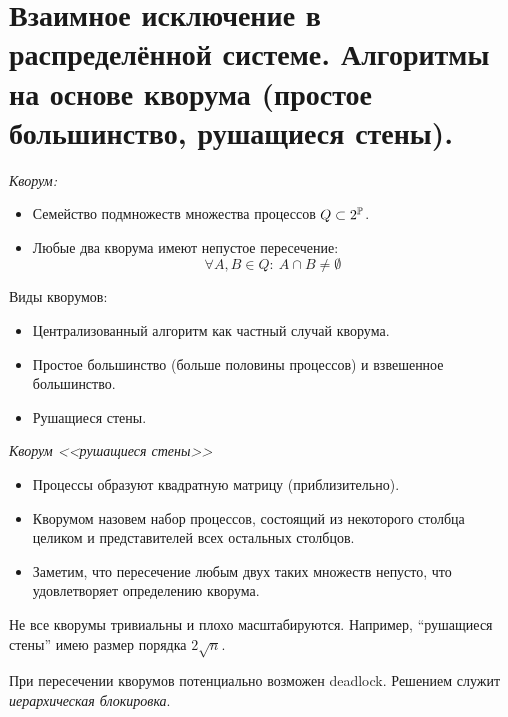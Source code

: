 \section{Взаимное исключение в распределённой системе.
Алгоритмы на основе кворума (простое большинство, рушащиеся стены).}

\begin{definition} \textit{Кворум:}
    \begin{itemize}
        \item Семейство подмножеств множества процессов $Q \subset 2^{\mathbb{P}}$.
        \item Любые два кворума имеют непустое пересечение:
            \[
                \forall A, B \in Q\colon~ A \cap B \neq \emptyset
            \]
    \end{itemize}
\end{definition}

\begin{examples} Виды кворумов:
    \begin{itemize}
        \item Централизованный алгоритм как частный случай кворума.
        \item Простое большинство (больше половины процессов) и взвешенное большинство.
        \item Рушащиеся стены.
    \end{itemize}
\end{examples}

\begin{definition} \textit{Кворум <<рушащиеся стены>>}
    \begin{itemize}
        \item Процессы образуют квадратную матрицу (приблизительно).
        \item Кворумом назовем набор процессов, состоящий из некоторого столбца 
            целиком и представителей всех остальных столбцов.
        \item Заметим, что пересечение любым двух таких множеств непусто, что 
            удовлетворяет определению кворума.
    \end{itemize}
\end{definition}

\begin{remark}
    Не все кворумы тривиальны и плохо масштабируются. Например, ``рушащиеся стены''
    имею размер порядка $2\sqrt{n}$.
\end{remark}

\begin{remark}
    При пересечении кворумов потенциально возможен deadlock. Решением служит 
    \textit{иерархическая блокировка}.
\end{remark}
